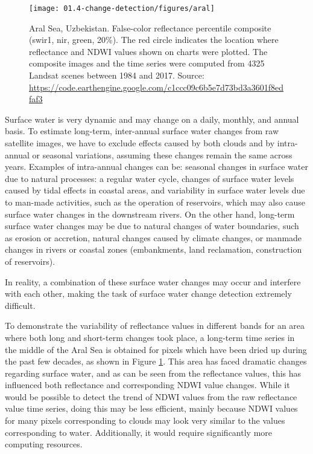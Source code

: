 \begin{figure}[H]
	\texttt{[image: 01.4-change-detection/figures/aral]}
	\caption{Aral Sea, Uzbekistan. False-color reflectance percentile composite (swir1, nir, green, 20\%). The red circle indicates the location where reflectance and NDWI values shown on charts were plotted. The composite images and the time series were computed from 4325 Landsat scenes between 1984 and 2017. Source: \url{https://code.earthengine.google.com/c1ccc09c6b5e7d73bd3a3601f8edfaf3}}
	\label{fig:ch4-aral-sea}
\end{figure}

Surface water is very dynamic and may change on a daily, monthly, and annual basis. To estimate long-term, inter-annual surface water changes from raw satellite images, we have to exclude effects caused by both clouds and by intra-annual or seasonal variations, assuming these changes remain the same across years. Examples of intra-annual changes can be: seasonal changes in surface water due to natural processes: a regular water cycle, changes of surface water levels caused by tidal effects in coastal areas, and variability in surface water levels due to man-made activities, such as the operation of reservoirs, which may also cause surface water changes in the downstream rivers. On the other hand, long-term surface water changes may be due to natural changes of water boundaries, such as erosion or accretion, natural changes caused by climate changes, or manmade changes in rivers or coastal zones (embankments, land reclamation, construction of reservoirs). 

In reality, a combination of these surface water changes may occur and interfere with each other, making the task of surface water change detection extremely difficult.

To demonstrate the variability of reflectance values in different bands for an area where both long and short-term changes took place, a long-term time series in the middle of the Aral Sea is obtained for pixels which have been dried up during the past few decades, as shown in Figure \ref{fig:ch4-aral-sea}. This area has faced dramatic changes regarding surface water, and as can be seen from the reflectance values, this has influenced both reflectance and corresponding NDWI value changes. While it would be possible to detect the trend of NDWI values from the raw reflectance value time series, doing this may be less efficient, mainly because NDWI values for many pixels corresponding to clouds may look very similar to the values corresponding to water. Additionally, it would require significantly more computing resources.

